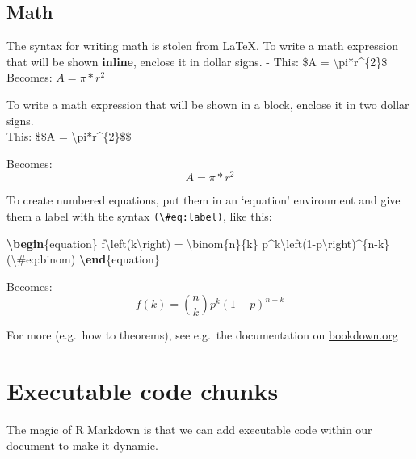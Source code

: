 \documentclass[a4paper, nobind]{templates/ociamthesis}
\newenvironment{Shaded}{\begin{snugshade}}{\end{snugshade}}
\newcommand{\ExtensionTok}[1]{#1}
\newcommand{\KeywordTok}[1]{\textcolor[rgb]{0.13,0.29,0.53}{\textbf{#1}}}
\newcommand{\NormalTok}[1]{#1}
\newcommand{\SpecialCharTok}[1]{\textcolor[rgb]{0.00,0.00,0.00}{#1}}
\newcommand{\SpecialStringTok}[1]{\textcolor[rgb]{0.31,0.60,0.02}{#1}}
\renewenvironment{Shaded}
{
  \vspace{10pt}%
  \begin{snugshade}%
}{%
  \end{snugshade}%
  \vspace{8pt}%
}
\begin{document}
\hypertarget{math}{%
\subsection{Math}\label{math}}

The syntax for writing math is stolen from LaTeX. To write a math expression that will be shown \textbf{inline}, enclose it in dollar signs.
- This: \$A = \textbackslash pi*r\^{}\{2\}\$ Becomes: \(A = \pi*r^{2}\)

To write a math expression that will be shown in a block, enclose it in two dollar signs.\\
This: \$\$A = \textbackslash pi*r\^{}\{2\}\$\$

Becomes:
\[A = \pi*r^{2}\]

To create numbered equations, put them in an `equation' environment and give them a label with the syntax \texttt{(\textbackslash{}\#eq:label)}, like this:

\begin{Shaded}
\begin{Highlighting}[]
\KeywordTok{\textbackslash{}begin}\NormalTok{\{}\ExtensionTok{equation}\NormalTok{\}}\SpecialStringTok{ }
\SpecialStringTok{  f}\SpecialCharTok{\textbackslash{}left}\SpecialStringTok{(k}\SpecialCharTok{\textbackslash{}right}\SpecialStringTok{) = }\SpecialCharTok{\textbackslash{}binom}\SpecialStringTok{\{n\}\{k\} p\^{}k}\SpecialCharTok{\textbackslash{}left}\SpecialStringTok{(1{-}p}\SpecialCharTok{\textbackslash{}right}\SpecialStringTok{)\^{}\{n{-}k\}}
\SpecialStringTok{  (}\SpecialCharTok{\textbackslash{}\#}\SpecialStringTok{eq:binom)}
\KeywordTok{\textbackslash{}end}\NormalTok{\{}\ExtensionTok{equation}\NormalTok{\} }
\end{Highlighting}
\end{Shaded}

Becomes:
\begin{equation}
f\left(k\right)=\binom{n}{k}p^k\left(1-p\right)^{n-k}
\label{eq:binom}
\end{equation}

For more (e.g.~how to theorems), see e.g.~the documentation on \href{https://bookdown.org/yihui/bookdown/markdown-extensions-by-bookdown.html\#equations}{bookdown.org}

\hypertarget{code}{%
\section{Executable code chunks}\label{code}}

The magic of R Markdown is that we can add executable code within our document to make it dynamic.
\end{document}
